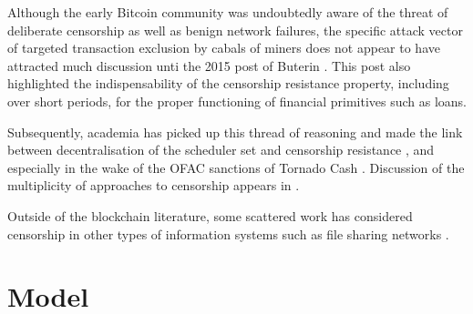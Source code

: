 Although the early Bitcoin community was undoubtedly aware of the threat of deliberate censorship as well as benign network failures, the specific attack vector of targeted transaction exclusion by cabals of miners does not appear to have attracted much discussion unti the 2015 post of Buterin \cite{buterin2015problem}.
%
This post also highlighted the indispensability of the censorship resistance property, including over short periods, for the proper functioning of financial primitives such as loans.

Subsequently, academia has picked up this thread of reasoning and made the link between decentralisation of the scheduler set and censorship resistance \cite{gencer2018decentralization,silva2020impact}, and especially in the wake of the OFAC sanctions of Tornado Cash \cite{wahrstatter2024blockchain}.
%
Discussion of the multiplicity of approaches to censorship appears in \cite[\S4.3]{wahrstatter2024blockchain}.

Outside of the blockchain literature, some scattered work has considered censorship in other types of information systems such as file sharing networks \cite{perng2005censorship,danezis2004economics}.




\section{Model}
\label{section:model}

